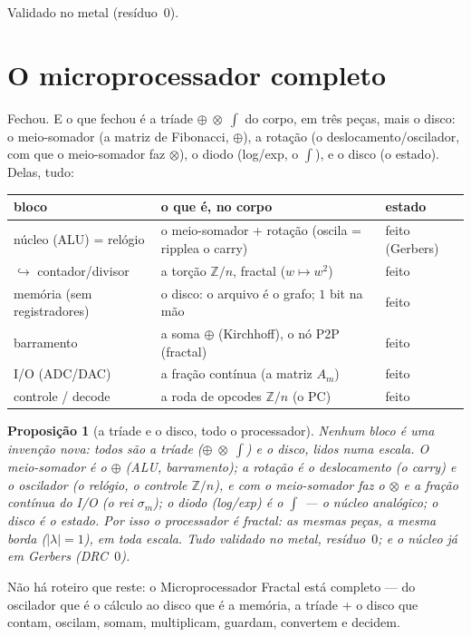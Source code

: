 \documentclass[11pt,a4paper]{article}
\newtheorem{proposicao}{Proposição}
\begin{document}
Validado no metal (resíduo~$0$).

\section{O microprocessador completo}

Fechou. E o que fechou é a tríade $\oplus\;\otimes\;\displaystyle\int$ do corpo, em três peças, mais o disco:
o meio-somador (a matriz de Fibonacci, $\oplus$), a rotação (o deslocamento/oscilador, com que o
meio-somador faz $\otimes$), o diodo (log/exp, o $\displaystyle\int$), e o disco (o estado). Delas, tudo:

\begin{center}
\begin{tabular}{@{}lll@{}}
\toprule
bloco & o que é, no corpo & estado \\
\midrule
núcleo (ALU) = relógio & o meio-somador + rotação (oscila = ripplea o carry) & feito (Gerbers) \\
\quad$\hookrightarrow$ contador/divisor & a torção $\mathbb{Z}/n$, fractal ($w\mapsto w^{2}$) & feito \\
memória (sem registradores) & o disco: o arquivo é o grafo; $1$ bit na mão & feito \\
barramento & a soma $\oplus$ (Kirchhoff), o nó P2P (fractal) & feito \\
I/O (ADC/DAC) & a fração contínua (a matriz $A_{m}$) & feito \\
controle / decode & a roda de opcodes $\mathbb{Z}/n$ (o PC) & feito \\
\bottomrule
\end{tabular}
\end{center}

\begin{proposicao}[a tríade e o disco, todo o processador]
Nenhum bloco é uma invenção nova: todos são a tríade ($\oplus\;\otimes\;\displaystyle\int$) e o disco,
lidos numa escala. O meio-somador é o $\oplus$ (ALU, barramento); a rotação é o deslocamento (o carry)
e o oscilador (o relógio, o controle $\mathbb{Z}/n$), e com o meio-somador faz o $\otimes$ e a fração contínua
do I/O (o rei $\sigma_{m}$); o diodo (log/exp) é o $\displaystyle\int$ --- o núcleo analógico; o disco é o estado.
Por isso o processador é fractal: as mesmas peças, a mesma borda ($|\lambda|=1$), em toda escala.
Tudo validado no metal, resíduo~$0$; e o núcleo já em Gerbers (DRC~$0$).
\end{proposicao}

Não há roteiro que reste: o Microprocessador Fractal está completo --- do oscilador que é o
cálculo ao disco que é a memória, a tríade + o disco que contam, oscilam, somam, multiplicam,
guardam, convertem e decidem.
\end{document}
